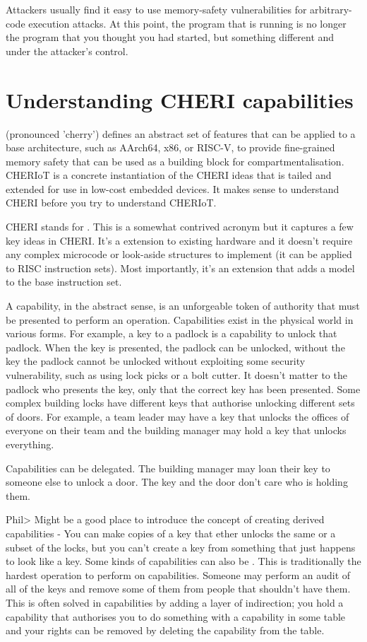 Attackers usually find it easy to use memory-safety vulnerabilities for arbitrary-code execution attacks.
At this point, the program that is running is no longer the program that you thought you had started, but something different and under the attacker's control.

\section{Understanding CHERI capabilities}

 (pronounced 'cherry') defines an abstract set of features that can be applied to a base architecture, such as AArch64, x86, or RISC-V, to provide fine-grained memory safety that can be used as a building block for compartmentalisation.
CHERIoT is a concrete instantiation of the CHERI ideas that is tailed and extended for use in low-cost embedded devices.
It makes sense to understand CHERI before you try to understand CHERIoT.

CHERI stands for .
This is a somewhat contrived acronym but it captures a few key ideas in CHERI.
It's a extension to existing hardware and it doesn't require any complex microcode or look-aside structures to implement (it can be applied to RISC instruction sets).
Most importantly, it's an extension that adds a  model to the base instruction set.

A capability, in the abstract sense, is an unforgeable token of authority that must be presented to perform an operation.
Capabilities exist in the physical world in various forms.
For example, a key to a padlock is a capability to unlock that padlock.
When the key is presented, the padlock can be unlocked, without the key the padlock cannot be unlocked without exploiting some security vulnerability, such as using lock picks or a bolt cutter.
It doesn't matter to the padlock who presents the key, only that the correct key has been presented.
Some complex building locks have different keys that authorise unlocking different sets of doors.
For example, a team leader may have a key that unlocks the offices of everyone on their team and the building manager may hold a key that unlocks everything.

Capabilities can be delegated.
The building manager may loan their key to someone else to unlock a door.
The key and the door don't care who is holding them.

Phil> Might be a good place to introduce the concept of creating derived capabilities - You can make copies of a key that ether unlocks the same or a subset of the locks, but you can't create a key from something that just happens to look like a key. 
Some kinds of capabilities can also be .
This is traditionally the hardest operation to perform on capabilities.
Someone may perform an audit of all of the keys and remove some of them from people that shouldn't have them.
This is often solved in capabilities by adding a layer of indirection; you hold a capability that authorises you to do something with a capability in some table and your rights can be removed by deleting the capability from the table.

